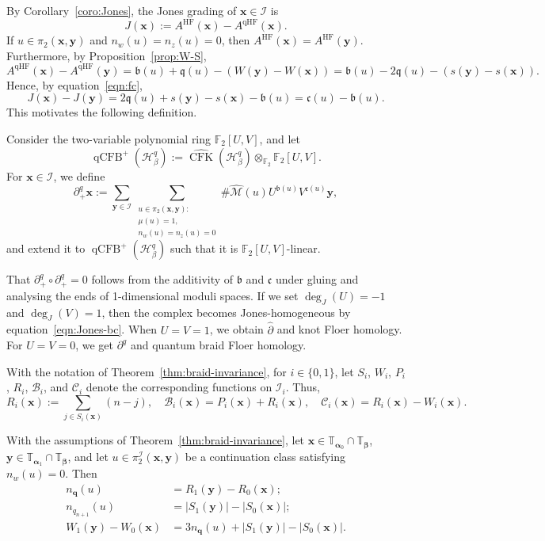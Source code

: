 \documentclass[11pt]{amsart}
\numberwithin{equation}{section}
\numberwithin{figure}{section}
\theoremstyle{definition}
\newcommand{\cB}{\mathcal{B}}
\newcommand{\cC}{\mathcal{C}}
\newcommand{\cH}{\mathcal{H}}
\newcommand{\cI}{\mathcal{I}}
\newcommand{\cM}{\mathcal{M}}
\newcommand{\bF}{\mathbb{F}}
\newcommand{\bT}{\mathbb{T}}
\newcommand{\ph}{\widehat{\partial}}
\newcommand{\sI}{\mathscr{I}}
\newcommand{\fb}{\mathfrak{b}}
\newcommand{\fc}{\mathfrak{c}}
\newcommand{\fq}{\mathfrak{q}}
\DeclareMathOperator{\qHF}{qHF}
\DeclareMathOperator{\qCFB}{qCFB}
\DeclareMathOperator{\CFK}{CFK}
\newcommand{\cMh}{\widehat{\cM}}
\newcommand{\CFKh}{\widehat{\CFK}}
\DeclareMathOperator{\HF}{HF}
\newcommand{\as}{\boldsymbol{\alpha}}
\newcommand{\bs}{\boldsymbol{\beta}}
\newcommand{\qs}{\boldsymbol{q}}
\newcommand{\xs}{\boldsymbol{x}}
\newcommand{\ys}{\boldsymbol{y}}
\begin{document}
By Corollary~\ref{coro:Jones}, the Jones grading of $\xs \in \cI$ is
\[
J(\xs) := A^{\HF}(\xs) - A^{\qHF}(\xs).
\]
If $u \in \pi_2(\xs,\ys)$ and $n_w(u) = n_z(u) = 0$, then $A^{\HF}(\xs) = A^{\HF}(\ys)$. Furthermore, by Proposition~\ref{prop:W-S},
\[
A^{\qHF}(\xs) - A^{\qHF}(\ys) = \fb(u) + \fq(u) - (W(\ys) - W(\xs)) = \fb(u) - 2\fq(u) - (s(\ys) - s(\xs)).
\]
Hence, by equation~\eqref{eqn:fc},
\begin{equation}\label{eqn:Jones-bc}
J(\xs) - J(\ys) = 2\fq(u) + s(\ys) - s(\xs) - \fb(u) = \fc(u) - \fb(u).
\end{equation}
This motivates the following definition.

\begin{defn}
    Consider the two-variable polynomial ring $\bF_2[U,V]$, and let
    \[
    \qCFB^+(\cH^q_\beta) := \CFKh(\cH^q_\beta) \otimes_{\bF_2} \bF_2[U,V].
    \]
    For $\xs \in \cI$, we define
    \[
    \partial^q_+ \xs := \sum_{\ys \in \cI} \sum_{\substack{u \in \pi_2(\xs,\ys):\\ \mu(u)=1,\\ n_w(u) = n_z(u) = 0}} \#\cMh(u) U^{\fb(u)} V^{\fc(u)} \ys,
    \]
    and extend it to $\qCFB^+(\cH^q_\beta)$ such that it is $\bF_2[U,V]$-linear.
\end{defn}

That $\partial^q_+ \circ \partial^q_+ = 0$ follows from the additivity of $\fb$ and $\fc$ under gluing and analysing the ends of 1-dimensional moduli spaces. If we set $\deg_J(U) = -1$ and $\deg_J(V) = 1$, then the complex becomes Jones-homogeneous by equation~\eqref{eqn:Jones-bc}. When $U = V = 1$, we obtain $\ph$ and knot Floer homology. For $U=V=0$, we get $\partial^q$ and quantum braid Floer homology. 

With the notation of Theorem~\ref{thm:braid-invariance}, for $i \in \{0,1\}$, let $S_i$, $W_i$, $P_i$, $R_i$, $\cB_i$, and $\cC_i$ denote the corresponding functions on $\cI_i$. Thus,
\[
R_i(\xs) := \sum_{j \in S_i(\xs)} (n-j), \quad \cB_i(\xs) = P_i(\xs) + R_i(\xs), \quad \cC_i(\xs) = R_i(\xs) - W_i(\xs).
\]

\begin{lem}\label{lem:W-S-continuation}
    With the assumptions of Theorem~\ref{thm:braid-invariance}, let $\xs \in \bT_{\as_0} \cap \bT_{\bs}$, $\ys \in \bT_{\as_1} \cap \bT_{\bs}$, and let $u \in \pi_2^{\sI}(\xs, \ys)$ be a continuation class satisfying $n_w(u) = 0$. Then
    \[
    \begin{split}
    n_{\qs}(u) &= R_1(\ys) - R_0(\xs); \\
    n_{q_{n+1}}(u) &= |S_1(\ys)| - |S_0(\xs)|; \\
    W_1(\ys) - W_0(\xs) &= 3n_{\qs}(u) + |S_1(\ys)| - |S_0(\xs)|. \\
    \end{split}
    \]
\end{lem}
\end{document}
